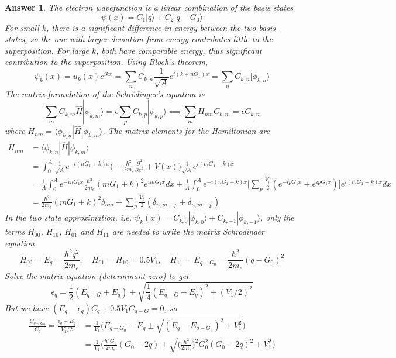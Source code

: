 \documentclass[a4paper]{article}
\newtheorem{ans}{Answer}[section]
\theoremstyle{new}
\begin{document}
\begin{ans}
The electron wavefunction is a linear combination of the basis states
$$\psi(x)=C_1|q\rangle+C_2|q-G_0\rangle$$
For small $k$, there is a significant difference in energy between the two basis-states, so the one with larger deviation from energy contributes little to the superposition. For large $k$, both have comparable energy, thus significant contribution to the superposition. Using Bloch's theorem,
$$\psi_k(x)=u_k(x)e^{ikx}=\sum_nC_{k,n}\frac{1}{\sqrt{A}}e^{i(k+nG_1)x}=\sum_nC_{k,n}|\phi_{k,n}\rangle$$
The matrix formulation of the Schr\"{o}dinger's equation is
$$\sum_mC_{k,m}\hat{H}|\phi_{k,m}\rangle=\epsilon\sum_pC_{k,p}|\phi_{k,p}\rangle\implies\sum_mH_{nm}C_{k,m}=\epsilon C_{k,n}$$
where $H_{nm}=\langle\phi_{k,n}|\hat{H}|\phi_{k,m}\rangle$. The matrix elements for the Hamiltonian are
\begin{align}
    H_{nm}&=\langle\phi_{k,n}|\hat{H}|\phi_{k,m}\rangle\nonumber\\&=\int_0^A\frac{1}{\sqrt{A}}e^{-i(nG_1+k)x}\bigg(-\frac{\hbar^2}{2m_e}\frac{\partial^2}{\partial x^2}+V(x)\bigg)\frac{1}{\sqrt{A}}e^{i(mG_1+k)x}\nonumber\\&=\frac{1}{A}\int_0^Ae^{-inG_1x}\frac{\hbar^2}{2m_e}(mG_1+k)^2e^{imG_1x}dx+\frac{1}{A}\int_0^Ae^{-i(nG_1+k)x}\bigg[\sum_p\frac{V_p}{2}(e^{-ipG_1x}+e^{ipG_1x})\bigg]e^{i(mG_1+k)x}dx\nonumber\\&=\frac{\hbar^2}{2m_e}(mG_1+k)^2\delta_{nm}+\sum_p\frac{V_p}{2}(\delta_{n,m+p}+\delta_{n,m-p})\nonumber
\end{align}
In the two state approximation, i.e. $\psi_k(x)=C_{k,0}|\phi_{k,0}\rangle+C_{k,-1}|\phi_{k,-1}\rangle$, only the terms $H_{00}$, $H_{10}$, $H_{01}$ and $H_{11}$ are needed to write the matrix Schrodinger equation. 
$$H_{00}=E_q=\frac{\hbar^2q^2}{2m_e},\quad H_{01}=H_{10}=0.5V_1,\quad H_{11}=E_{q-G_0}=\frac{\hbar^2}{2m_e}(q-G_0)^2$$
Solve the matrix equation (determinant zero) to get
$$\epsilon_q=\frac{1}{2}(E_{q-G}+E_q)\pm\sqrt{\frac{1}{4}(E_{q-G}-E_q)^2+(V_1/2)^2}$$
But we have $(E_q-\epsilon_q)C_q+0.5V_1C_{q-G}=0$, so
\begin{align}
\frac{C_{q-G_0}}{C_q}=\frac{\epsilon_q-E_q}{V_1/2}&=\frac{1}{V_1}\bigg(E_{q-G_0}-E_q\pm\sqrt{(E_q-E_{q-G_0})^2+V_1^2}\bigg)\nonumber\\&=\frac{1}{V_1}\bigg(\frac{\hbar^2G_0}{2m_e}(G_0-2q)\pm\sqrt{\bigg(\frac{\hbar^2}{2m_e}\bigg)^2G_0^2(G_0-2q)^2+V_1^2}\bigg)\nonumber
\end{align}
\begin{center}
\begin{tikzpicture}

\end{tikzpicture}
\end{center}
\end{ans}
\end{document}
